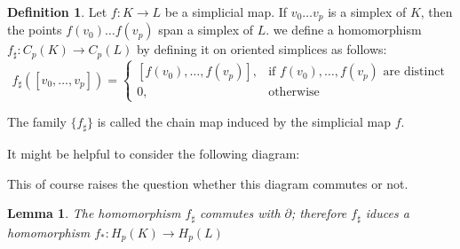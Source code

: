 \documentclass[draft,toc=bib]{scrartcl}
\theoremstyle{plain}
\newtheorem{lemma}[theorem]{Lemma}
\theoremstyle{definition}
\newtheorem	{definition}[theorem]{Definition}
\theoremstyle{remark}
\begin{document}
\begin{definition}
	Let $f: K\to L$ be a simplicial map. If $v_0\dots v_p$ is a simplex of $K$, then the points $f(v_0)\dots f(v_p)$ span a simplex of $L$. we define a homomorphism $f_\sharp: C_p(K)\to C_p(L)$ by defining it on oriented simplices as follows:
	\[
	f_\sharp([v_0,\dots,v_p])=\begin{cases}
	[f(v_0),\dots, f(v_p)],& \text{if } f(v_0),\dots, f(v_p) \text{ are distinct}\\
	0,&\text{otherwise}
	\end{cases}
	\]
	
	The family $\{f_\sharp\}$ is called the chain map induced by the simplicial map $f$.
\end{definition}

It might be helpful to consider the following diagram:

\begin{center}
	
\end{center}

This of course raises the question whether this diagram commutes or not. 
\begin{lemma}
	The homomorphism $f_\sharp$ commutes with $\partial$; therefore $f_\sharp$ iduces a homomorphism $f_\ast:H_p(K)\to H_p(L)$
\end{lemma}
\end{document}
